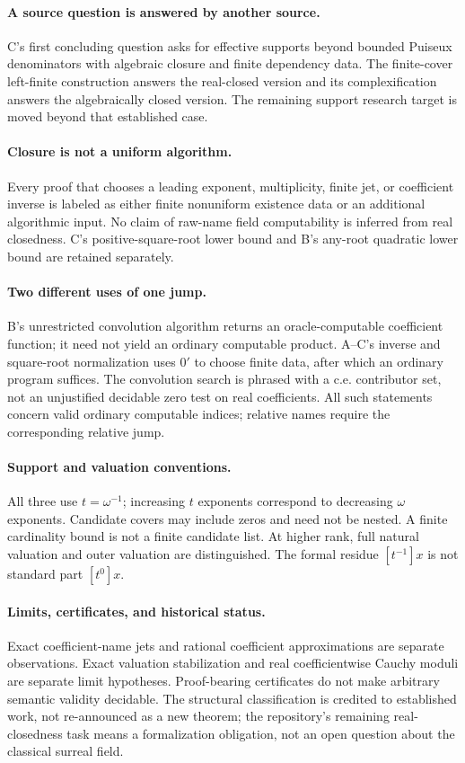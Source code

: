 \documentclass[11pt,letterpaper]{article}
\numberwithin{equation}{section}
\theoremstyle{definition}
\theoremstyle{remark}
\begin{document}
\paragraph{A source question is answered by another source.}
C's first concluding question asks for effective supports beyond bounded
Puiseux denominators with algebraic closure and finite dependency data.
The finite-cover left-finite construction answers the real-closed version
and its complexification answers the algebraically closed version. The
remaining support research target is moved beyond that established case.

\paragraph{Closure is not a uniform algorithm.}
Every proof that chooses a leading exponent, multiplicity, finite jet, or
coefficient inverse is labeled as either finite nonuniform existence data
or an additional algorithmic input. No claim of raw-name field computability
is inferred from real closedness. C's positive-square-root lower bound and
B's any-root quadratic lower bound are retained separately.

\paragraph{Two different uses of one jump.}
B's unrestricted convolution algorithm returns an oracle-computable
coefficient function; it need not yield an ordinary computable product.
A--C's inverse and square-root normalization uses $0'$ to choose finite data,
after which an ordinary program suffices. The convolution search is phrased
with a c.e. contributor set, not an unjustified decidable zero test on real
coefficients. All such statements concern valid ordinary computable indices;
relative names require the corresponding relative jump.

\paragraph{Support and valuation conventions.}
All three use $t=\omega^{-1}$; increasing $t$ exponents correspond to
 decreasing $\omega$ exponents. Candidate covers may include zeros and need
not be nested. A finite cardinality bound is not a finite candidate list.
At higher rank, full natural valuation and outer valuation are distinguished.
The formal residue $[t^{-1}]x$ is not standard part $[t^0]x$.

\paragraph{Limits, certificates, and historical status.}
Exact coefficient-name jets and rational coefficient approximations are
separate observations. Exact valuation stabilization and real coefficientwise
Cauchy moduli are separate limit hypotheses. Proof-bearing certificates do
not make arbitrary semantic validity decidable. The structural classification
is credited to established work, not re-announced as a new theorem; the
repository's remaining real-closedness task means a formalization obligation,
not an open question about the classical surreal field.
\end{document}
